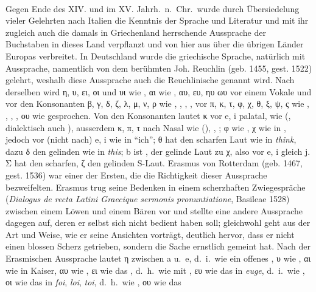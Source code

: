 \paragraph{} Gegen Ende des XIV\@. und im XV\@. Jahrh.~n.~Chr.~wurde durch
Übersiedelung vieler  Gelehrten nach Italien die Kenntnis der
 Sprache und Literatur und mit ihr zugleich auch die damals in
Griechenland herrschende Aussprache der Buchstaben in dieses Land verpflanzt und
von hier aus über die übrigen Länder Europas verbreitet. In Deutschland wurde
die griechische Sprache, natürlich mit  Aussprache, namentlich
von dem berühmten Joh. Reuchlin (geb. 1455, gest. 1522) gelehrt,  weshalb diese
Aussprache auch die Reuchlinische genannt wird.
Nach derselben wird η, υ, ει, οι und υι wie , αι wie , αυ, ευ, ηυ ωυ vor einem
Vokale und vor den Konsonanten β, γ, δ, ζ, λ, μ, ν, ρ wie , ,
, , vor π,
κ, τ, φ, χ, θ, ξ, ψ, ς wie , , , , ου wie
 gesprochen. Von den
Konsonanten lautet κ vor e, i palatal, wie  (, dialektisch
auch ),
ausserdem κ, π, τ nach Nasal wie  (), , ; φ wie
, χ wie  in , jedoch
vor (nicht nach) e, i wie  in “ich”; θ hat den scharfen  Laut wie in
\emph{think}, dazu δ den gelinden wie in \emph{this}; b ist ,  der gelinde
Laut zu χ, also vor e, i gleich j. Σ hat den scharfen, ζ den gelinden S-Laut.
Erasmus von Rotterdam (geb. 1467, gest. 1536) war einer der Ersten, die die
Richtigkeit dieser Aussprache bezweifelten.
Erasmus trug seine Bedenken in einem scherzhaften Zwiegespräche (\emph{Dialogus
	de recta Latini Graecique sermonis pronuntiatione}, Basileae 1528) zwischen
einem Löwen und einem Bären vor und stellte eine andere Aussprache dagegen auf,
deren er selbst sich nicht bedient haben soll; gleichwohl geht aus der Art und
Weise, wie er seine Ansichten vorträgt, deutlich hervor, dass er nicht einen
blossen Scherz getrieben, sondern die Sache ernstlich gemeint hat.
Nach der Erasmischen Aussprache lautet η zwischen a u.~e, d.~i.~wie ein offenes
, υ wie  , αι wie  in Kaiser, αυ wie
, ει wie das  , d.~h.~wie  mit
, ευ wie das   in \emph{euge}, d.~i.~wie
, οι wie das   in
\emph{foi}, \emph{loi}, \emph{toi}, d.~h.~wie , ου wie das
 
